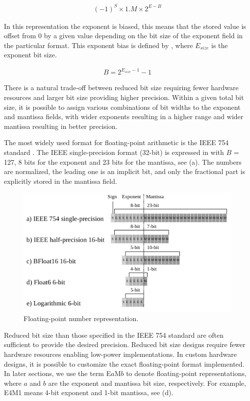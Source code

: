 \begin{eqnarray} \label{eq:float}
(-1)^{S} \times 1.M \times 2^{E-B}
\end{eqnarray}

In this representation the exponent is biased, this means that the stored value is offset from 0 by a given value depending on the bit size of the exponent field in the particular format. This exponent bias is defined by , where $E_{size}$ is the exponent bit size.

\begin{eqnarray} \label{eq:float_bias}
B=2^{E_{size}-1}-1
\end{eqnarray}

There is a natural trade-off between reduced bit size requiring fewer hardware resources and larger bit size providing higher precision. Within a given total bit size, it is possible to assign various combinations of bit widths to the exponent and mantissa fields, with wider exponents resulting in a higher range and wider mantissa resulting in better precision.

The most widely used format for floating-point arithmetic is the IEEE 754 standard \cite{zuras2008ieee}. The IEEE single-precision format (32-bit) is expressed in  with $B$ = 127, 8 bits for the exponent and 23 bits for the mantissa, see (a). The numbers are normalized, the leading one is an implicit bit, and only the fractional part is explicitly stored in the mantissa field.

\begin{figure}[h!]
	\centering
	\includegraphics[width=1\columnwidth]{../figures/power_breakdown/floating_point.pdf}
	\caption{Floating-point number representation.}
	\label{fig:floating}
\end{figure}

Reduced bit size than those specified in the IEEE 754 standard are often sufficient to provide the desired precision. Reduced bit size designs require fewer hardware resources enabling low-power implementations. In custom hardware designs, it is possible to customize the exact floating-point format implemented. In later sections, we use the term E$a$M$b$ to denote floating-point representations, where $a$ and $b$ are the exponent and mantissa bit size, respectively. For example, E4M1 means 4-bit exponent and 1-bit mantissa, see (d).